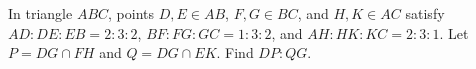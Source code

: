 In triangle $ABC$, points $D,E\in AB$, $F,G\in BC$, and $H,K\in AC$ satisfy $AD:DE:EB=2:3:2$, $BF:FG:GC=1:3:2$, and $AH:HK:KC=2:3:1$. Let $P=DG\cap FH$ and $Q=DG\cap EK$. Find $DP:QG$.
